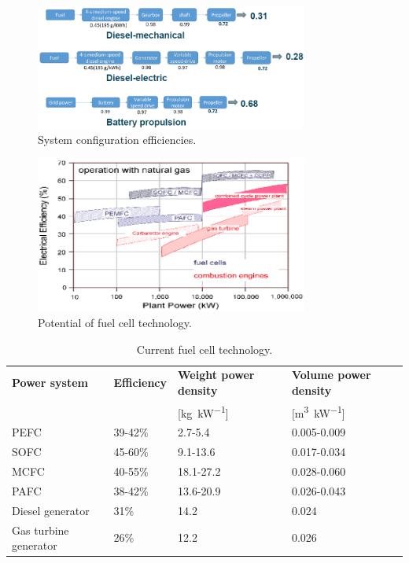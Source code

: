 \begin{figure}[H]
    \centering
    \includegraphics[width = 0.8\textwidth]{img/figure68.png}
    \caption{System configuration efficiencies.}
\end{figure}

\begin{figure}[H]
    \centering
    \includegraphics[width = 0.8\textwidth]{img/figure69.png}
    \caption{Potential of fuel cell technology.}
\end{figure}

\begin{table}[H]
    \centering
    \begin{tabular}{@{}llll@{}}
        \toprule
        \textbf{Power system} & \textbf{Efficiency} & \textbf{Weight power density}   & \textbf{Volume power density}     \\
                              &                     & [\si{\kilo\gram\per\kilo\watt}] & [\si{\meter\cubed\per\kilo\watt}] \\
        \midrule
        PEFC                  & 39-42\%             & 2.7-5.4                         & 0.005-0.009                       \\
        SOFC                  & 45-60\%             & 9.1-13.6                        & 0.017-0.034                       \\
        MCFC                  & 40-55\%             & 18.1-27.2                       & 0.028-0.060                       \\
        PAFC                  & 38-42\%             & 13.6-20.9                       & 0.026-0.043                       \\
        Diesel generator      & 31\%                & 14.2                            & 0.024                             \\
        Gas turbine generator & 26\%                & 12.2                            & 0.026                             \\
        \bottomrule
    \end{tabular}
    \caption{Current fuel cell technology.}
\end{table}


